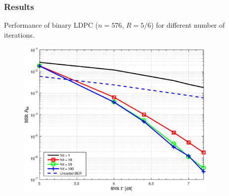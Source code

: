 \documentclass[]{beamer}
\begin{document}




\begin{frame}
\transwipe[direction=0]
\frametitle{Results}
Performance of binary LDPC ($n = 576$, $R = 5/6$) for different number of iterations.
\begin{center}
\begin{figure}
\includegraphics[width=9.8cm, trim={0 0 0 0.9cm},clip]{figure1/Nit}
\end{figure}
\end{center}

\end{frame}
\end{document}
